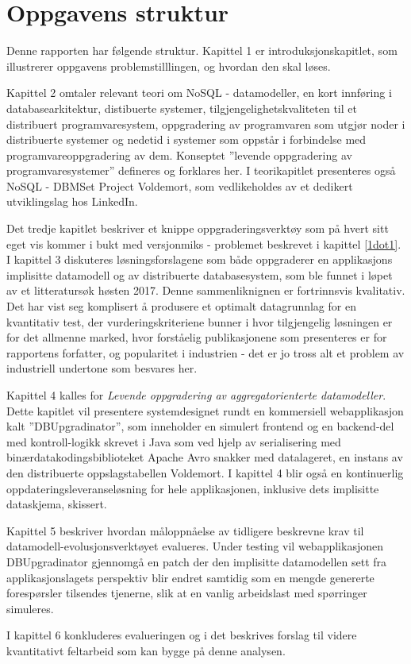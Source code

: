 \section{Oppgavens struktur}

Denne rapporten har følgende struktur. Kapittel 1 er introduksjonskapitlet, som illustrerer oppgavens problemstilllingen, og hvordan den skal løses.

Kapittel 2 omtaler relevant teori om NoSQL - datamodeller, en kort innføring i databasearkitektur, distibuerte systemer, tilgjengelighetskvaliteten til et distribuert programvaresystem, oppgradering av programvaren som utgjør noder i distribuerte systemer og nedetid i systemer som oppstår i forbindelse med programvareoppgradering av dem. Konseptet ''levende oppgradering av programvaresystemer'' defineres og forklares her. I teorikapitlet presenteres også NoSQL - DBMSet Project Voldemort, som vedlikeholdes av et dedikert utviklingslag hos LinkedIn.

Det tredje kapitlet beskriver et knippe oppgraderingsverktøy som på hvert sitt eget vis kommer i bukt med versjonmiks - problemet beskrevet i kapittel \ref{1dot1}. I kapittel 3 diskuteres løsningsforslagene som både oppgraderer en applikasjons implisitte datamodell og av distribuerte databasesystem, som ble funnet i løpet av et litteratursøk høsten 2017. Denne sammenliknignen er fortrinnsvis kvalitativ. Det har vist seg komplisert å produsere et optimalt datagrunnlag for en kvantitativ test, der vurderingskriteriene bunner i hvor tilgjengelig løsningen er for det allmenne marked, hvor forståelig publikasjonene som presenteres er for rapportens forfatter, og popularitet i industrien - det er jo tross alt et problem av industriell undertone som besvares her.

Kapittel 4 kalles for \emph{Levende oppgradering av aggregatorienterte datamodeller}. Dette kapitlet vil presentere systemdesignet rundt en kommersiell webapplikasjon kalt ''DBUpgradinator'', som inneholder en simulert frontend og en backend-del med kontroll-logikk skrevet i Java som ved hjelp av serialisering med binærdatakodingsbiblioteket Apache Avro snakker med datalageret, en instans av den distribuerte oppslagstabellen Voldemort. I kapittel 4 blir også en kontinuerlig oppdateringsleveranseløsning for hele applikasjonen, inklusive dets implisitte dataskjema, skissert. %

Kapittel 5 beskriver hvordan måloppnåelse av tidligere beskrevne krav til datamodell-evolusjonsverktøyet evalueres. Under testing vil webapplikasjonen DBUpgradinator gjennomgå en patch der den implisitte datamodellen sett fra applikasjonslagets perspektiv blir endret samtidig som en mengde genererte forespørsler tilsendes tjenerne, slik at en vanlig arbeidslast med spørringer simuleres.

I kapittel 6 konkluderes evalueringen og i det beskrives forslag til videre kvantitativt feltarbeid som kan bygge på denne analysen.
